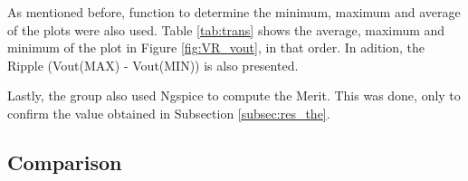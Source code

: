 As mentioned before, function to determine the minimum, maximum and average of the
plots were also used. Table \ref{tab:trans} shows the average, maximum and minimum
of the plot in Figure \ref{fig:VR_vout}, in that order. In adition, the Ripple
(Vout(MAX) - Vout(MIN)) is also presented.



Lastly, the group also used Ngspice to compute the Merit. This was done, only to confirm
the value obtained in Subsection \ref{subsec:res_the}.



\subsection{Comparison}






